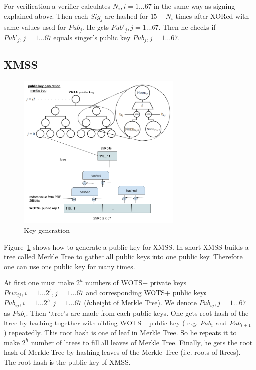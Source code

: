 \documentclass[a4paper,10pt,twocolumn]{article}
\begin{document}
 For verification a verifier calculates \(N_i, i=1 \ldots 67 \) in the same way as signing explained above.
 Then each \( Sig_j \) are hashed for \(15-N_i\)  times after XORed with same  values  used for \( Pub_{j} \).
 He gets \( Pub'_j , j=1 \ldots 67\). Then he checks if  \( Pub'_j,  j=1 \ldots 67 \) equals singer's public key \( Pub_j,  j=1 \ldots 67 \).

\subsection{XMSS}

\begin{figure}[ht]
	\begin{center}
	\includegraphics[width=80mm]{xmss_pub.png}
	  \caption{Key generation}
    \label{fig:xmss_pub}
	\end{center}
 \end{figure}

Figure~\ref{fig:xmss_pub} shows how to generate a public key for XMSS. In short XMSS builds a tree called Merkle Tree
to gather all public keys into one public key. Therefore one can use one public key for many times.

At first one must make \( 2^h \)  numbers of WOTS+ private keys \( Priv_{ij}, i = 1 \ldots 2^h ,  j=1 \ldots 67\) and 
corresponding WOTS+ public keys \( Pub_{ij}, i = 1 \ldots 2^h , j=1 \ldots 67 \)  (\(h\):height of Merkle Tree).
We denote \( Pub_{ij} , j=1 \ldots 67 \) as  \( Pub_{i} \).
Then  `ltree's are made
from each public keys. One gets root hash of the ltree by hashing together with sibling WOTS+ public key
( e.g.  \( Pub_{i} \) and  \( Pub_{i+1} \) ) repeatedly. This root hash is one of leaf
in Merkle Tree.
So he repeats it to make \( 2^h \) number of ltrees to fill all leaves of Merkle Tree.
Finally, he gets the root hash of Merkle Tree by hashing leaves of the Merkle Tree (i.e. roots of ltrees).
The root hash is the public key of XMSS.
\end{document}
